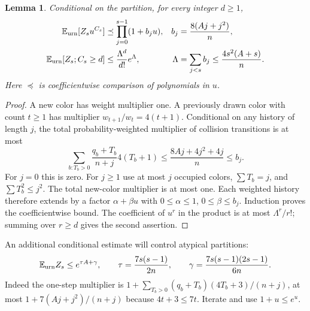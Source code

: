 \documentclass[11pt,letterpaper]{article}
\newtheorem{lemma}[theorem]{Lemma}\newtheorem{proposition}[theorem]{Proposition}\newtheorem{corollary}[theorem]{Corollary}
\theoremstyle{remark}\newtheorem{remark}[theorem]{Remark}
\theoremstyle{definition}\newtheorem{definition}[theorem]{Definition}
\begin{document}
\begin{lemma}\label{sgm:co:lem:marked}
Conditional on the partition, for every integer $d\ge1$,
\begin{align}
 \mathbb E_{\rm urn}[Z_su^{C_s}]&\preceq\prod_{j=0}^{s-1}(1+b_ju),
 &b_j&=\frac{8(Aj+j^2)}n,\label{sgm:co:eq:marked}\\
 \mathbb E_{\rm urn}[Z_s;C_s\ge d]&\le\frac{\Lambda^d}{d!}e^\Lambda,
 &\Lambda&=\sum_{j<s}b_j\le\frac{4s^2(A+s)}n.\label{sgm:co:eq:colltail}
\end{align}
Here $\preceq$ is coefficientwise comparison of polynomials in $u$.
\end{lemma}
\begin{proof}
A new color has weight multiplier one. A previously drawn color with count $t\ge1$ has multiplier $w_{t+1}/w_t=4(t+1)$. Conditional on any history of length $j$, the total probability-weighted multiplier of collision transitions is at most
\[
 \sum_{b:T_b>0}\frac{q_b+T_b}{n+j}4(T_b+1)
 \le\frac{8Aj+4j^2+4j}{n}\le b_j.
\]
For $j=0$ this is zero. For $j\ge1$ use at most $j$ occupied colors, $\sum T_b=j$, and $\sum T_b^2\le j^2$. The total new-color multiplier is at most one. Each weighted history therefore extends by a factor $\alpha+\beta u$ with $0\le\alpha\le1$, $0\le\beta\le b_j$. Induction proves the coefficientwise bound. The coefficient of $u^r$ in the product is at most $\Lambda^r/r!$; summing over $r\ge d$ gives the second assertion.
\end{proof}
An additional conditional estimate will control atypical partitions:
\begin{equation}\label{sgm:co:eq:Zbound}
 \mathbb E_{\rm urn}Z_s\le e^{\tau A+\gamma},\qquad
 \tau=\frac{7s(s-1)}{2n},\qquad
 \gamma=\frac{7s(s-1)(2s-1)}{6n}.
\end{equation}
Indeed the one-step multiplier is
$1+\sum_{T_b>0}(q_b+T_b)(4T_b+3)/(n+j)$, at most
$1+7(Aj+j^2)/(n+j)$ because $4t+3\le7t$. Iterate and use $1+u\le e^u$.
\end{document}
